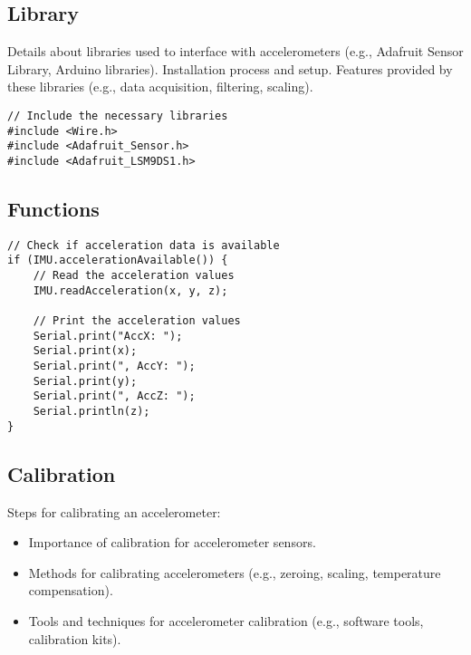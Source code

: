 \subsection{Library}
Details about libraries used to interface with accelerometers (e.g., Adafruit Sensor Library, Arduino libraries).
Installation process and setup.
Features provided by these libraries (e.g., data acquisition, filtering, scaling).
\begin{verbatim}
// Include the necessary libraries
#include <Wire.h>
#include <Adafruit_Sensor.h>
#include <Adafruit_LSM9DS1.h>
\end{verbatim}
\subsection{Functions}
\begin{verbatim}
// Check if acceleration data is available
if (IMU.accelerationAvailable()) {
	// Read the acceleration values
	IMU.readAcceleration(x, y, z);
	
	// Print the acceleration values
	Serial.print("AccX: ");
	Serial.print(x);
	Serial.print(", AccY: ");
	Serial.print(y);
	Serial.print(", AccZ: ");
	Serial.println(z);
}

\end{verbatim}
\subsection{Calibration}
Steps for calibrating an accelerometer:
\begin{itemize}
	\item Importance of calibration for accelerometer sensors.
	\item Methods for calibrating accelerometers (e.g., zeroing, scaling, temperature compensation).
	\item Tools and techniques for accelerometer calibration (e.g., software tools, calibration kits).
\end{itemize}

